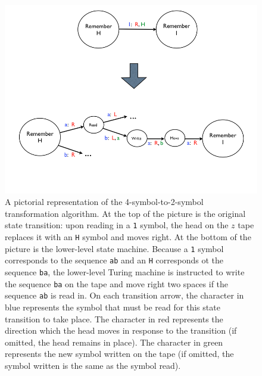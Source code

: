\documentclass[11pt]{report}
\begin{document}
\begin{figure} 
\begin{center} 
\includegraphics[scale=0.4]{figs/goldbach6.png} 
\caption{A pictorial representation of the 4-symbol-to-2-symbol transformation algorithm. At the top of the picture is the original state transition: upon reading in a \texttt{1} symbol, the head on the $z$ tape replaces it with an \texttt{H} symbol and moves right. At the bottom of the picture is the lower-level state machine. Because a \texttt{1} symbol corresponds to the sequence \texttt{ab} and an \texttt{H} corresponds ot the sequence \texttt{ba}, the lower-level Turing machine is instructed to write the sequence \texttt{ba} on the tape and move right two spaces if the sequence \texttt{ab} is read in. On each transition arrow, the character in blue represents the symbol that must be read for this state transition to take place. The character in red represents the direction which the head moves in response to the transition (if omitted, the head remains in place). The character in green represents the new symbol written on the tape (if omitted, the symbol written is the same as the symbol read). \label{fig:goldbach6}}
\end{center} 
\end{figure}
\end{document}
